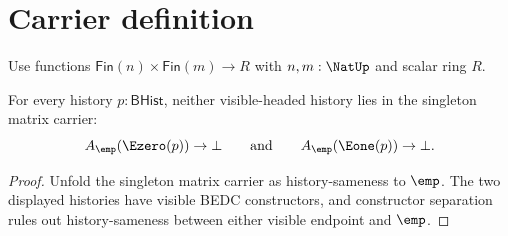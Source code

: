 \section{Carrier definition}

\begin{definition}
\label{def:matrix-carrier}
Use functions \(\mathsf{Fin}(n)\times\mathsf{Fin}(m)\to R\) with \(n,m:\NatUp\) and scalar ring \(R\).
\end{definition}

\begin{theorem}
\label{thm:matrix-singleton-carrier-visible-absurd}
For every history \(p:\mathsf{BHist}\), neither visible-headed history lies in
the singleton matrix carrier:
$$
A_{\emp}(\Ezero(p))\to\bot
\qquad\text{and}\qquad
A_{\emp}(\Eone(p))\to\bot.
$$
\end{theorem}
\begin{proof}
Unfold the singleton matrix carrier as history-sameness to \(\emp\). The two
displayed histories have visible BEDC constructors, and constructor separation
rules out history-sameness between either visible endpoint and \(\emp\).
\end{proof}
